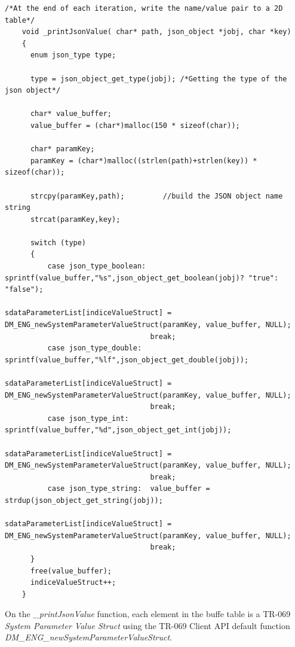 \begin{lstlisting}[mathescape]
    /*At the end of each iteration, write the name/value pair to a 2D table*/
    void _printJsonValue( char* path, json_object *jobj, char *key)
    {
      enum json_type type;

      type = json_object_get_type(jobj); /*Getting the type of the json object*/

      char* value_buffer;
      value_buffer = (char*)malloc(150 * sizeof(char));

      char* paramKey;
      paramKey = (char*)malloc((strlen(path)+strlen(key)) * sizeof(char));

      strcpy(paramKey,path);         //build the JSON object name string
      strcat(paramKey,key);

      switch (type)
      {
          case json_type_boolean: sprintf(value_buffer,"%s",json_object_get_boolean(jobj)? "true": "false");
                                  sdataParameterList[indiceValueStruct] = DM_ENG_newSystemParameterValueStruct(paramKey, value_buffer, NULL);
                                  break;
          case json_type_double:  sprintf(value_buffer,"%lf",json_object_get_double(jobj));
                                  sdataParameterList[indiceValueStruct] = DM_ENG_newSystemParameterValueStruct(paramKey, value_buffer, NULL);
                                  break;
          case json_type_int:     sprintf(value_buffer,"%d",json_object_get_int(jobj));
                                  sdataParameterList[indiceValueStruct] = DM_ENG_newSystemParameterValueStruct(paramKey, value_buffer, NULL);
                                  break;
          case json_type_string:  value_buffer = strdup(json_object_get_string(jobj));
                                  sdataParameterList[indiceValueStruct] = DM_ENG_newSystemParameterValueStruct(paramKey, value_buffer, NULL);
                                  break;
      }
      free(value_buffer);
      indiceValueStruct++;
    }
\end{lstlisting}

On the \textit{_printJsonValue} function, each element in the buffe table is a TR-069 \textit{System Parameter Value Struct} using the TR-069 Client API default function \textit{DM_ENG_newSystemParameterValueStruct}.
